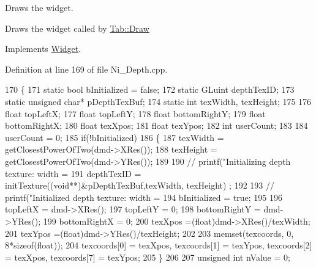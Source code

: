 Draws the widget. 

Draws the widget called by \hyperlink{class_tab_ae9db0c3ae8b0b75f7c5b3493b0267482}{Tab\+::\+Draw} 

Implements \hyperlink{class_widget_ac4c2063cd671468ad05d84cfe963c032}{Widget}.



Definition at line 169 of file Ni\+\_\+\+Depth.\+cpp.


\begin{DoxyCode}
170 \{
171     \textcolor{keyword}{static} \textcolor{keywordtype}{bool} bInitialized = \textcolor{keyword}{false};   
172         \textcolor{keyword}{static} GLuint depthTexID;
173         \textcolor{keyword}{static} \textcolor{keywordtype}{unsigned} \textcolor{keywordtype}{char}* pDepthTexBuf;
174         \textcolor{keyword}{static} \textcolor{keywordtype}{int} texWidth, texHeight;
175 
176         \textcolor{keywordtype}{float} topLeftX;
177         \textcolor{keywordtype}{float} topLeftY;
178         \textcolor{keywordtype}{float} bottomRightY;
179         \textcolor{keywordtype}{float} bottomRightX;
180         \textcolor{keywordtype}{float} texXpos;
181         \textcolor{keywordtype}{float} texYpos;
182         \textcolor{keywordtype}{int} userCount;
183 
184         userCount = 0;
185         \textcolor{keywordflow}{if}(!bInitialized)
186         \{
187                 texWidth =  getClosestPowerOfTwo(dmd->XRes());
188                 texHeight = getClosestPowerOfTwo(dmd->YRes());
189 
190 \textcolor{comment}{//              printf("Initializing depth texture: width = %
191                 depthTexID = initTexture((\textcolor{keywordtype}{void}**)&pDepthTexBuf,texWidth, texHeight) ;
192 
193 \textcolor{comment}{//              printf("Initialized depth texture: width = %
194                 bInitialized = \textcolor{keyword}{true};
195 
196                 topLeftX = dmd->XRes();
197                 topLeftY = 0;
198                 bottomRightY = dmd->YRes();
199                 bottomRightX = 0;
200                 texXpos =(float)dmd->XRes()/texWidth;
201                 texYpos  =(float)dmd->YRes()/texHeight;
202 
203                 memset(texcoords, 0, 8*\textcolor{keyword}{sizeof}(\textcolor{keywordtype}{float}));
204                 texcoords[0] = texXpos, texcoords[1] = texYpos, texcoords[2] = texXpos, texcoords[7] = 
      texYpos;
205         \}
206 
207         \textcolor{keywordtype}{unsigned} \textcolor{keywordtype}{int} nValue = 0;
}}
\end{DoxyCode}
